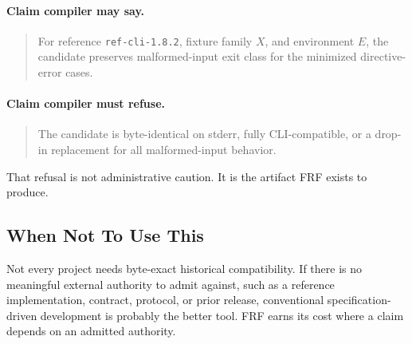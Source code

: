 \documentclass[11pt,a4paper]{article}
\newcommand{\frf}{\textsc{FRF}}
\begin{document}
\paragraph{Claim compiler may say.}
\begin{quote}
For reference \texttt{ref-cli-1.8.2}, fixture family \(X\), and environment \(E\), the candidate preserves malformed-input exit class for the minimized directive-error cases.
\end{quote}

\paragraph{Claim compiler must refuse.}
\begin{quote}
The candidate is byte-identical on stderr, fully CLI-compatible, or a drop-in replacement for all malformed-input behavior.
\end{quote}

That refusal is not administrative caution. It is the artifact \frf{} exists to produce.

\subsection{When Not To Use This}

Not every project needs byte-exact historical compatibility. If there is no meaningful external authority to admit against, such as a reference implementation, contract, protocol, or prior release, conventional specification-driven development is probably the better tool. \frf{} earns its cost where a claim depends on an admitted authority.
\end{document}
